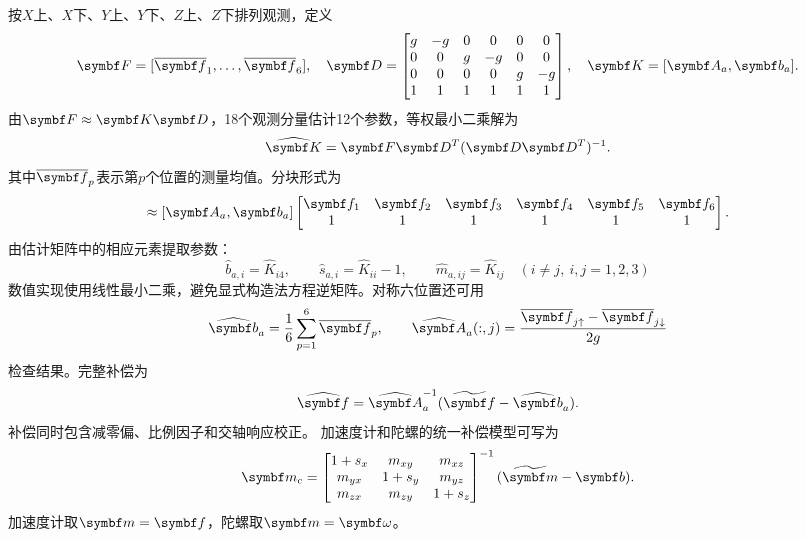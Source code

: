 按$X$上、$X$下、$Y$上、$Y$下、$Z$上、$Z$下排列观测，定义
\begin{equation}
\matr F=[\overline{\matr f}_1,\ldots,\overline{\matr f}_6],\quad
\matr D=\begin{bmatrix}g&-g&0&0&0&0\\0&0&g&-g&0&0\\0&0&0&0&g&-g\\1&1&1&1&1&1\end{bmatrix},\quad
\matr K=[\matr A_a,\matr b_a].
\end{equation}
由$\matr F\approx\matr K\matr D$，18个观测分量估计12个参数，等权最小二乘解为
\begin{equation}
\widehat{\matr K}=\matr F\matr D^T(\matr D\matr D^T)^{-1}.
\label{eq:accls}\end{equation}
其中$\overline{\matr f}_p$表示第$p$个位置的测量均值。分块形式为
\begin{equation}
[\overline{\matr f}_1,\ldots,\overline{\matr f}_6]
\approx[\matr A_a,\matr b_a]
\begin{bmatrix}\matr f_1&\matr f_2&\matr f_3&\matr f_4&\matr f_5&\matr f_6\\1&1&1&1&1&1\end{bmatrix}.
\label{eq:accblocks}\end{equation}
由估计矩阵中的相应元素提取参数：
\begin{equation}
\widehat b_{a,i}=\widehat K_{i4},\qquad
\widehat s_{a,i}=\widehat K_{ii}-1,\qquad
\widehat m_{a,ij}=\widehat K_{ij}\quad(i\ne j,\ i,j=1,2,3)
\end{equation}
数值实现使用线性最小二乘，避免显式构造法方程逆矩阵。对称六位置还可用
\begin{equation}
\widehat{\matr b}_a=\frac16\sum_{p=1}^6\overline{\matr f}_p,\qquad
\widehat{\matr A}_a(:,j)=\frac{\overline{\matr f}_{j\uparrow}-\overline{\matr f}_{j\downarrow}}{2g}
\end{equation}
检查结果。完整补偿为
\begin{equation}
\widehat{\matr f}=\widehat{\matr A}_a^{-1}(\widetilde{\matr f}-\widehat{\matr b}_a).
\label{eq:acccomp}\end{equation}
补偿同时包含减零偏、比例因子和交轴响应校正。
加速度计和陀螺的统一补偿模型可写为
\begin{equation}
\matr m_c=
\begin{bmatrix}1+s_x&m_{xy}&m_{xz}\\m_{yx}&1+s_y&m_{yz}\\m_{zx}&m_{zy}&1+s_z\end{bmatrix}^{-1}
(\widetilde{\matr m}-\matr b).
\label{eq:generalcomp}\end{equation}
加速度计取$\matr m=\matr f$，陀螺取$\matr m=\matr\omega$。

